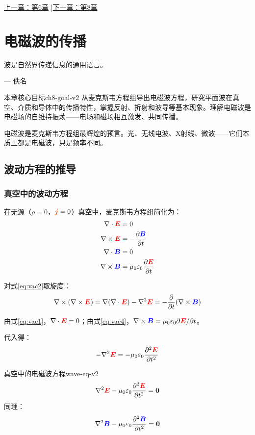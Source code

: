 \documentclass[11pt,a4paper,openany,oneside]{book}
\newcommand{\vecE}{\textcolor{red}{\vect{E}}}
\newcommand{\vecB}{\textcolor{blue}{\vect{B}}}
\newcommand{\vecJ}{\textcolor{cororange}{\vect{j}}}
\newcommand{\eps}{\varepsilon}
\newcommand{\muz}{\mu_0}
\newcommand{\vect}[1]{\bm{#1}}
\newcommand{\grad}{\nabla}
\newcommand{\curl}{\nabla\times}
\newcommand{\divg}{\nabla\cdot}
\newcommand{\lap}{\nabla^2}
\begin{document}
\begin{center}\small \hyperlink{ch6-goal}{上一章：第6章} \quad|\quad \hyperlink{ch8-goal}{下一章：第8章}\end{center}

\chapter{电磁波的传播}
\epigraph{波是自然界传递信息的通用语言。}{--- 佚名}

\hypertarget{ch8-goal}{}\begin{insight}{本章核心目标}{ch8-goal-v2}
从麦克斯韦方程组导出电磁波方程，研究平面波在真空、介质和导体中的传播特性，掌握反射、折射和波导等基本现象。理解电磁波是电磁场的自维持振荡——电场和磁场相互激发、共同传播。
\end{insight}

电磁波是麦克斯韦方程组最辉煌的预言。光、无线电波、X射线、微波——它们本质上都是电磁波，只是频率不同。

\section{波动方程的推导}

\subsection{真空中的波动方程}

在无源（$\rho = 0$，$\vecJ = 0$）真空中，麦克斯韦方程组简化为：
\begin{align}
\divg\vecE &= 0 \label{eq:vac1} \\
\curl\vecE &= -\frac{\partial\vecB}{\partial t} \label{eq:vac2} \\
\divg\vecB &= 0 \label{eq:vac3} \\
\curl\vecB &= \muz\eps_0\frac{\partial\vecE}{\partial t} \label{eq:vac4}
\end{align}

对式\eqref{eq:vac2}取旋度：
\[
\curl(\curl\vecE) = \grad(\divg\vecE) - \lap\vecE = -\frac{\partial}{\partial t}(\curl\vecB)
\]

由式\eqref{eq:vac1}，$\divg\vecE = 0$；由式\eqref{eq:vac4}，$\curl\vecB = \muz\eps_0\partial\vecE/\partial t$。

代入得：
\[
-\lap\vecE = -\muz\eps_0\frac{\partial^2\vecE}{\partial t^2}
\]

\begin{theorem}{真空中的电磁波方程}{wave-eq-v2}
\[
\lap\vecE - \muz\eps_0\frac{\partial^2\vecE}{\partial t^2} = \vect{0}
\]
同理：
\[
\lap\vecB - \muz\eps_0\frac{\partial^2\vecB}{\partial t^2} = \vect{0}
\]
\end{theorem}
\end{document}
